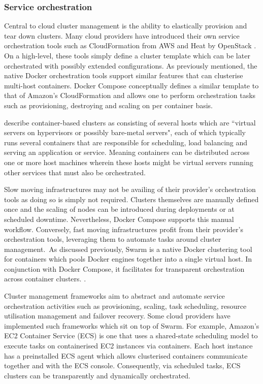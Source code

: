 \documentclass{report}
\begin{document}
\subsubsection{Service orchestration}
Central to cloud cluster management is the ability to elastically provision and tear down clusters. Many cloud providers have introduced their own service orchestration tools such as CloudFormation from AWS and Heat by OpenStack \citep{Dudouet}. 
On a high-level, these tools simply define a cluster template which can be later orchestrated with possibly extended configurations. As previously mentioned, the native Docker orchestration tools support similar features that can clusterise multi-host containers. Docker Compose conceptually defines a similar template to that of Amazon's CloudFormation and allows one to perform orchestration tasks such as provisioning, destroying and scaling on per container basis.
\par
\citet{Claus} describe container-based clusters as consisting of several hosts which are ``virtual servers on hypervisors or possibly bare-metal servers", each of which typically runs several containers that are responsible for scheduling, load balancing and serving an application or service. Meaning containers can be distributed across one or more host machines wherein these hosts might be virtual servers running other services that must also be orchestrated.
\par
Slow moving infrastructures may not be availing of their provider's orchestration tools as doing so is simply not required. Clusters themselves are manually defined once and the scaling of nodes can be introduced during deployments or at scheduled downtime. Nevertheless, Docker Compose supports this manual workflow. Conversely, fast moving infrastructures profit from their provider's orchestration tools, leveraging them to automate tasks around cluster management.\ As discussed previously, Swarm is a native Docker clustering tool for containers which pools Docker engines together into a single virtual host. In conjunction with Docker Compose, it facilitates for transparent orchestration across container clusters. \citep{holla}.
\par
Cluster management frameworks aim to abstract and automate service orchestration activities such as provisioning, scaling, task scheduling, resource utilisation management and failover recovery. Some cloud providers have implemented such frameworks which sit on top of Swarm. For example, Amazon's EC2 Container Service (ECS) is one that uses a shared-state scheduling model to execute tasks on containerised EC2 instances via containers. Each host instance has a preinstalled ECS agent which allows clusterised containers communicate together and with the ECS console. Consequently, via scheduled tasks, ECS clusters can be transparently and dynamically orchestrated.
\end{document}
